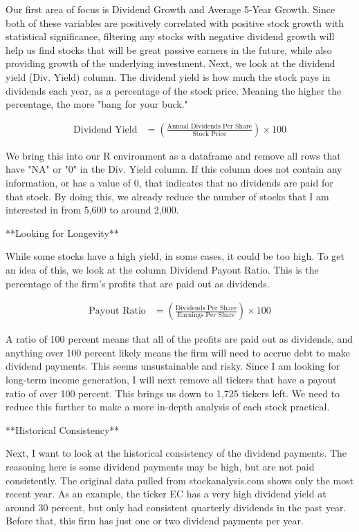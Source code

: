 \documentclass[12pt]{article}
\begin{document}
Our first area of focus is Dividend Growth and Average 5-Year Growth. Since both of these variables are positively correlated with positive stock growth with statistical significance, filtering any stocks with negative dividend growth will help us find stocks that will be great passive earners in the future, while also providing growth of the underlying investment. Next, we look at the dividend yield (Div. Yield) column. The dividend yield is how much the stock pays in dividends each year, as a percentage of the stock price. Meaning the higher the percentage, the more "bang for your buck."



\begin{align*}
\text{Dividend Yield} &= \left( \frac{\text{Annual Dividends Per Share}}{\text{Stock Price}} \right) \times 100
\end{align*}

We bring this into our R environment as a dataframe and remove all rows that have "NA" or "0" in the Div. Yield column. If this column does not contain any information, or has a value of 0, that indicates that no dividends are paid for that stock. By doing this, we already reduce the number of stocks that I am interested in from 5,600 to around 2,000.

**Looking for Longevity**

While some stocks have a high yield, in some cases, it could be too high. To get an idea of this, we look at the column Dividend Payout Ratio. This is the percentage of the firm's profits that are paid out as dividends.

\begin{align*}
\text{Payout Ratio} &= \left( \frac{\text{Dividends Per Share}}{\text{Earnings Per Share}} \right) \times 100
\end{align*}

A ratio of 100 percent means that all of the profits are paid out as dividends, and anything over 100 percent likely means the firm will need to accrue debt to make dividend payments. This seems unsustainable and risky. Since I am looking for long-term income generation, I will next remove all tickers that have a payout ratio of over 100 percent. This brings us down to 1,725 tickers left. We need to reduce this further to make a more in-depth analysis of each stock practical.

**Historical Consistency**

Next, I want to look at the historical consistency of the dividend payments. The reasoning here is some dividend payments may be high, but are not paid consistently. The original data pulled from stockanalysis.com shows only the most recent year. As an example, the ticker EC has a very high dividend yield at around 30 percent, but only had consistent quarterly dividends in the past year. Before that, this firm has just one or two dividend payments per year.
\end{document}
